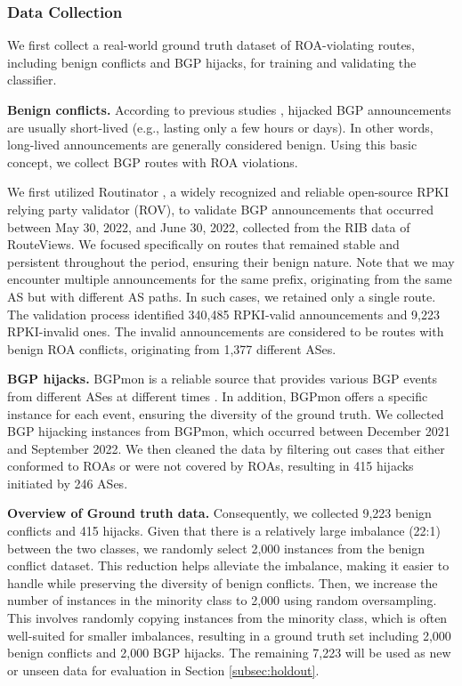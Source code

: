 \subsubsection{Data Collection} We first collect a real-world ground truth dataset of ROA-violating routes, including benign conflicts and BGP hijacks, for training and validating the classifier.

\noindent\textbf{Benign conflicts.} According to previous studies \cite{vervier2015mind, wijchers2014bgp, mahajan2002understanding}, hijacked BGP announcements are usually short-lived (e.g., lasting only a few hours or days). In other words, long-lived announcements are generally considered benign. Using this basic concept, we collect BGP routes with ROA violations.

We first utilized Routinator \cite{Routinator}, a widely recognized and reliable open-source RPKI relying party validator (ROV), to validate BGP announcements that occurred between May 30, 2022, and June 30, 2022, collected from the RIB data of RouteViews.
We focused specifically on routes that remained stable and persistent throughout the period, ensuring their benign nature. Note that we may encounter multiple announcements for the same prefix, originating from the same AS but with different AS paths. In such cases, we retained only a single route. The validation process identified 340,485 RPKI-valid announcements and 9,223 RPKI-invalid ones.
The invalid announcements are considered to be routes with benign ROA conflicts, originating from 1,377 different ASes.%
 
\noindent\textbf{BGP hijacks.} BGPmon \cite{BGPMon} is a reliable source that provides various BGP events from different ASes at different times \cite{van2019analysing}. In addition, BGPmon offers a specific instance for each event, ensuring the diversity of the ground truth. We collected BGP hijacking instances from BGPmon, which occurred between December 2021 and September 2022.
We then cleaned the data by filtering out cases that either conformed to ROAs or were not covered by ROAs, resulting in 415 hijacks initiated by 246 ASes.

\noindent\textbf{Overview of Ground truth data.} Consequently, we collected 9,223 benign conflicts and 415 hijacks. Given that there is a relatively large imbalance (22:1) between the two classes, we randomly select 2,000 instances from the benign conflict dataset. This reduction helps alleviate the imbalance, making it easier to handle while preserving the diversity of benign conflicts.
Then, we increase the number of instances in the minority class to 2,000 using random oversampling. This involves randomly copying instances from the minority class, which is often well-suited for smaller imbalances, resulting in a ground truth set including 2,000 benign conflicts and 2,000 BGP hijacks. The remaining 7,223 will be used as new or unseen data for evaluation in Section \ref{subsec:holdout}.

